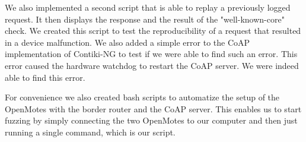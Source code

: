 We also implemented a second script that is able to replay a previously logged request. It then displays the response and the result of the "well-known-core" check. We created this script to test the reproducibility of a request that resulted in a device malfunction. We also added a simple error to the CoAP implementation of Contiki-NG to test if we were able to find such an error. This error caused the hardware watchdog to restart the CoAP server. We were indeed able to find this error.

For convenience we also created bash scripts to automatize the setup of the OpenMotes with the border router and the CoAP server. This enables us to start fuzzing by simply connecting the two OpenMotes to our computer and then just running a single command, which is our \python script.
